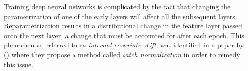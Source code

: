 Training deep neural networks is complicated by the fact that changing the parametrization of one of the early layers will affect all the subsequent layers.
Reparametrization results in a distributional change in the feature layer passed onto the next layer, a change that must be accounted for after each epoch.
This phenomenon, referred to as \textit{internal covariate shift}, was identified in a paper \cite{batch-normalization} by \citeauthor{batch-normalization} (\citeyear{batch-normalization}) where they propose a method called \textit{batch normalization} in order to remedy this issue.
